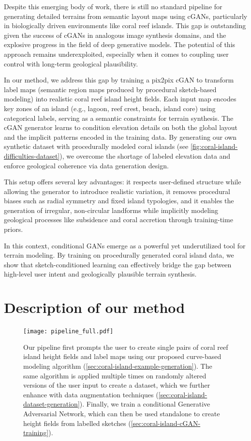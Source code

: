 Despite this emerging body of work, there is still no standard pipeline for generating detailed terrains from semantic layout maps using cGANs, particularly in biologically driven environments like coral reef islands. This gap is outstanding given the success of cGANs in analogous image synthesis domains, and the explosive progress in the field of deep generative models. The potential of this approach remains underexploited, especially when it comes to coupling user control with long-term geological plausibility.

\midConclusion

In our method, we address this gap by training a pix2pix cGAN to transform label maps (semantic region maps produced by procedural sketch-based modeling) into realistic coral reef island height fields. Each input map encodes key zones of an island (e.g., lagoon, reef crest, beach, island core) using categorical labels, serving as a semantic constraints for terrain synthesis. The cGAN generator learns to condition elevation details on both the global layout and the implicit patterns encoded in the training data. By generating our own synthetic dataset with procedurally modeled coral islands (see \cref{fig:coral-island-difficulties-dataset}), we overcome the shortage of labeled elevation data and enforce geological coherence via data generation design.

This setup offers several key advantages: it respects user-defined structure while allowing the generator to introduce realistic variation, it removes procedural biases such as radial symmetry and fixed island typologies, and it enables the generation of irregular, non-circular landforms while implicitly modeling geological processes like subsidence and coral accretion through training-time priors. 

In this context, conditional GANs emerge as a powerful yet underutilized tool for terrain modeling. By training on procedurally generated coral island data, we show that sketch-conditioned learning can effectively bridge the gap between high-level user intent and geologically plausible terrain synthesis.




\section{Description of our method}
\label{sec:coral-island-method-description}


\begin{figure}[H]
    \texttt{[image: pipeline\_full.pdf]}
    \caption{Our pipeline first prompts the user to create single pairs of coral reef island height fields and label maps using our proposed curve-based modeling algorithm (\cref{sec:coral-island-example-generation}). The same algorithm is applied multiple times on randomly altered versions of the user input to create a dataset, which we further enhance with data augmentation techniques (\cref{sec:coral-island-dataset-generation}). Finally, we train a conditional Generative Adversarial Network, which can then be used standalone to create height fields from labelled sketches (\cref{sec:coral-island-cGAN-training}). }
    \label{fig:coral-island-pipeline}
\end{figure}

